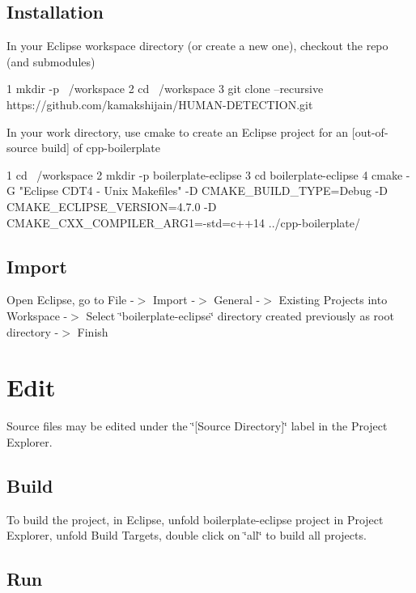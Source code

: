 \subsection*{Installation}

In your Eclipse workspace directory (or create a new one), checkout the repo (and submodules) 
\begin{DoxyCode}
1 mkdir -p ~/workspace
2 cd ~/workspace
3 git clone --recursive https://github.com/kamakshijain/HUMAN-DETECTION.git
\end{DoxyCode}


In your work directory, use cmake to create an Eclipse project for an \mbox{[}out-\/of-\/source build\mbox{]} of cpp-\/boilerplate


\begin{DoxyCode}
1 cd ~/workspace
2 mkdir -p boilerplate-eclipse
3 cd boilerplate-eclipse
4 cmake -G "Eclipse CDT4 - Unix Makefiles" -D CMAKE\_BUILD\_TYPE=Debug -D CMAKE\_ECLIPSE\_VERSION=4.7.0 -D
       CMAKE\_CXX\_COMPILER\_ARG1=-std=c++14 ../cpp-boilerplate/
\end{DoxyCode}


\subsection*{Import}

Open Eclipse, go to File -\/$>$ Import -\/$>$ General -\/$>$ Existing Projects into Workspace -\/$>$ Select \char`\"{}boilerplate-\/eclipse\char`\"{} directory created previously as root directory -\/$>$ Finish

\section*{Edit}

Source files may be edited under the \char`\"{}\mbox{[}\+Source Directory\mbox{]}\char`\"{} label in the Project Explorer.

\subsection*{Build}

To build the project, in Eclipse, unfold boilerplate-\/eclipse project in Project Explorer, unfold Build Targets, double click on \char`\"{}all\char`\"{} to build all projects.

\subsection*{Run}


